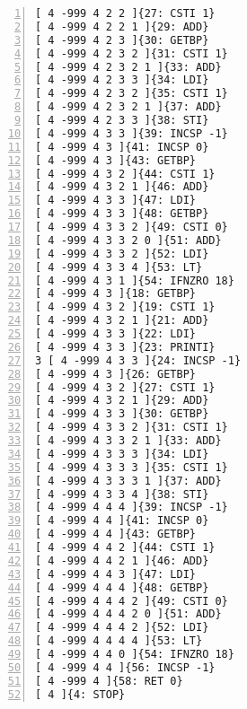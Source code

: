 \documentclass[a4paper, titlepage]{article}
\begin{document}
\begin{lstlisting}[numbers=left]
[ 4 -999 4 2 2 ]{27: CSTI 1}
[ 4 -999 4 2 2 1 ]{29: ADD}
[ 4 -999 4 2 3 ]{30: GETBP}
[ 4 -999 4 2 3 2 ]{31: CSTI 1}
[ 4 -999 4 2 3 2 1 ]{33: ADD}
[ 4 -999 4 2 3 3 ]{34: LDI}
[ 4 -999 4 2 3 2 ]{35: CSTI 1}
[ 4 -999 4 2 3 2 1 ]{37: ADD}
[ 4 -999 4 2 3 3 ]{38: STI}
[ 4 -999 4 3 3 ]{39: INCSP -1}
[ 4 -999 4 3 ]{41: INCSP 0}
[ 4 -999 4 3 ]{43: GETBP}
[ 4 -999 4 3 2 ]{44: CSTI 1}
[ 4 -999 4 3 2 1 ]{46: ADD}
[ 4 -999 4 3 3 ]{47: LDI}
[ 4 -999 4 3 3 ]{48: GETBP}
[ 4 -999 4 3 3 2 ]{49: CSTI 0}
[ 4 -999 4 3 3 2 0 ]{51: ADD}
[ 4 -999 4 3 3 2 ]{52: LDI}
[ 4 -999 4 3 3 4 ]{53: LT}
[ 4 -999 4 3 1 ]{54: IFNZRO 18}
[ 4 -999 4 3 ]{18: GETBP}
[ 4 -999 4 3 2 ]{19: CSTI 1}
[ 4 -999 4 3 2 1 ]{21: ADD}
[ 4 -999 4 3 3 ]{22: LDI}
[ 4 -999 4 3 3 ]{23: PRINTI}
3 [ 4 -999 4 3 3 ]{24: INCSP -1}
[ 4 -999 4 3 ]{26: GETBP}
[ 4 -999 4 3 2 ]{27: CSTI 1}
[ 4 -999 4 3 2 1 ]{29: ADD}
[ 4 -999 4 3 3 ]{30: GETBP}
[ 4 -999 4 3 3 2 ]{31: CSTI 1}
[ 4 -999 4 3 3 2 1 ]{33: ADD}
[ 4 -999 4 3 3 3 ]{34: LDI}
[ 4 -999 4 3 3 3 ]{35: CSTI 1}
[ 4 -999 4 3 3 3 1 ]{37: ADD}
[ 4 -999 4 3 3 4 ]{38: STI}
[ 4 -999 4 4 4 ]{39: INCSP -1}
[ 4 -999 4 4 ]{41: INCSP 0}
[ 4 -999 4 4 ]{43: GETBP}
[ 4 -999 4 4 2 ]{44: CSTI 1}
[ 4 -999 4 4 2 1 ]{46: ADD}
[ 4 -999 4 4 3 ]{47: LDI}
[ 4 -999 4 4 4 ]{48: GETBP}
[ 4 -999 4 4 4 2 ]{49: CSTI 0}
[ 4 -999 4 4 4 2 0 ]{51: ADD}
[ 4 -999 4 4 4 2 ]{52: LDI}
[ 4 -999 4 4 4 4 ]{53: LT}
[ 4 -999 4 4 0 ]{54: IFNZRO 18}
[ 4 -999 4 4 ]{56: INCSP -1}
[ 4 -999 4 ]{58: RET 0}
[ 4 ]{4: STOP}
\end{lstlisting}
\end{document}
